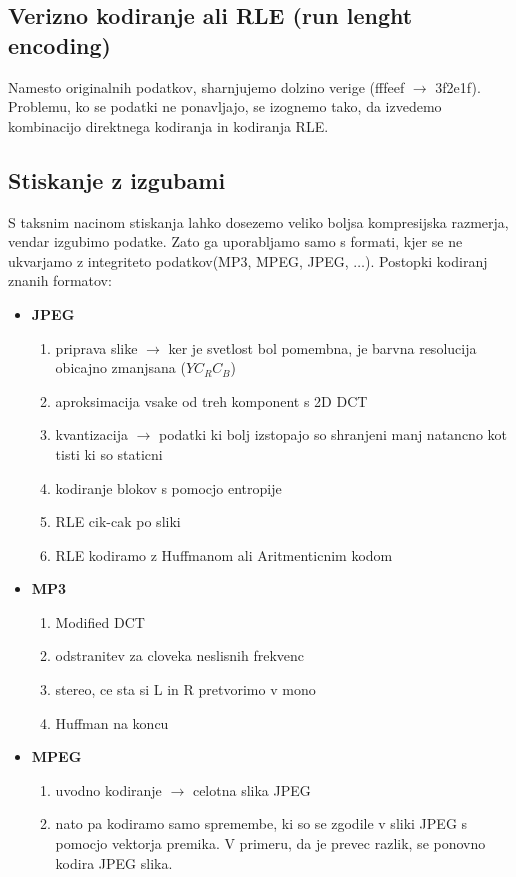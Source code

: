 \documentclass{article}
\begin{document}
\begin{multicols}{3}
\subsection{Verizno kodiranje ali RLE (run lenght encoding)} 
Namesto originalnih podatkov, sharnjujemo dolzino verige (fffeef $\rightarrow$ 3f2e1f).
Problemu, ko se podatki ne ponavljajo, se izognemo tako, da izvedemo kombinacijo direktnega kodiranja
in kodiranja RLE. %


\subsection{Stiskanje z izgubami}
S taksnim nacinom stiskanja lahko dosezemo veliko boljsa kompresijska razmerja, vendar izgubimo podatke.
Zato ga uporabljamo samo s formati, kjer se ne ukvarjamo z integriteto podatkov(MP3, MPEG, JPEG, $\dots$).
Postopki kodiranj znanih formatov:
\begin{itemize}
    \item \textbf{JPEG}
        \begin{enumerate}
            \item priprava slike $\rightarrow$ ker je svetlost bol pomembna, je barvna resolucija obicajno zmanjsana ($YC_RC_B$)
            \item aproksimacija vsake od treh komponent s 2D DCT
            \item kvantizacija $\rightarrow$  podatki ki bolj izstopajo so shranjeni manj natancno kot tisti ki so staticni
            \item kodiranje blokov s pomocjo entropije
            \item RLE cik-cak po sliki
            \item RLE kodiramo z Huffmanom ali Aritmenticnim kodom
        \end{enumerate}
    \item \textbf{MP3}
        \begin{enumerate}
            \item Modified DCT
            \item odstranitev za cloveka neslisnih frekvenc
            \item stereo, ce sta si L in R pretvorimo v mono
            \item Huffman na koncu
        \end{enumerate}
    \item \textbf{MPEG}
        \begin{enumerate}
            \item uvodno kodiranje $\rightarrow$ celotna slika JPEG
            \item nato pa kodiramo samo spremembe, ki so se zgodile v sliki JPEG s pomocjo vektorja premika. V
                primeru, da je prevec razlik, se ponovno kodira JPEG slika.
        \end{enumerate}
\end{itemize}


\end{multicols}
\end{document}
